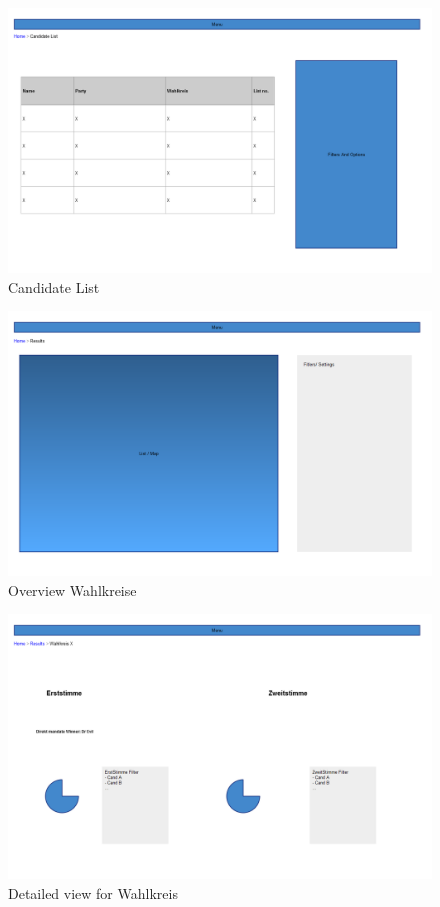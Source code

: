 \documentclass[10pt,a4paper]{article}
\begin{document}
\begin{figure}
	\centering
	\includegraphics[scale=.3]{CandidateList.png}
	\caption{Candidate List}
	\label{fig:clist}
\end{figure}



\begin{figure}
	\centering
	\includegraphics[scale=.3]{Results.png}
	\caption{Overview Wahlkreise}
	\label{fig:results}
\end{figure}

\begin{figure}
	\centering
	\includegraphics[scale=.3]{Wahlkreis.png}
	\caption{Detailed view for Wahlkreis}
	\label{fig:wkreis}
\end{figure}
\end{document}
